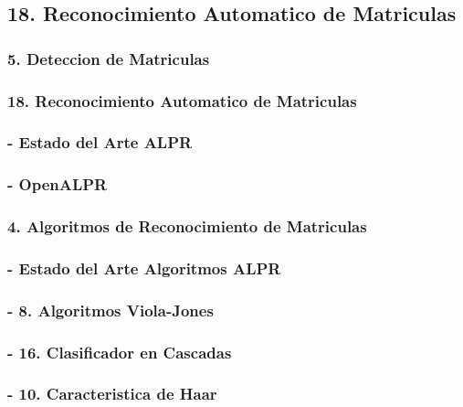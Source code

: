 	\subsection{18. Reconocimiento Automatico de Matriculas}

	    \subsubsection{5. Deteccion de Matriculas}
	    \subsubsection{18.  Reconocimiento Automatico de Matriculas}
	    \subsubsection{- Estado del Arte ALPR}
	    \subsubsection{- OpenALPR}
	    \subsubsection{4. Algoritmos de Reconocimiento de Matriculas}
	    \subsubsection{- Estado del Arte Algoritmos ALPR}
	    \subsubsection{- 8. Algoritmos Viola-Jones}
	    \subsubsection{  - 16. Clasificador en Cascadas}
	    \subsubsection{  - 10. Caracteristica de Haar}
